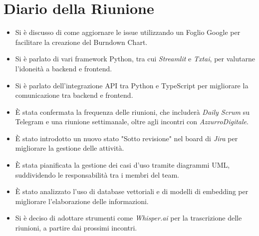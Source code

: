 
\section{Diario della Riunione}

\begin{itemize}
    \item Si è discusso di come aggiornare le issue utilizzando un Foglio Google per facilitare la creazione del Burndown Chart.
    \item Si è parlato di vari framework Python, tra cui \emph{Streamlit} e \emph{Txtai}, per valutarne l’idoneità a backend e frontend.
    \item Si è parlato dell'integrazione API tra Python e TypeScript per migliorare la comunicazione tra backend e frontend.
    \item È stata confermata la frequenza delle riunioni, che includerà \emph{Daily Scrum} su Telegram e una riunione settimanale, oltre agli incontri con \emph{AzzurroDigitale}.
    \item È stato introdotto un nuovo stato "Sotto revisione" nel board di \emph{Jira} per migliorare la gestione delle attività.
    \item È stata pianificata la gestione dei casi d’uso tramite diagrammi UML, suddividendo le responsabilità tra i membri del team.
    \item È stato analizzato l'uso di database vettoriali e di modelli di embedding per migliorare l’elaborazione delle informazioni.
    \item Si è deciso di adottare strumenti come \emph{Whisper.ai} per la trascrizione delle riunioni, a partire dai prossimi incontri.
\end{itemize}
